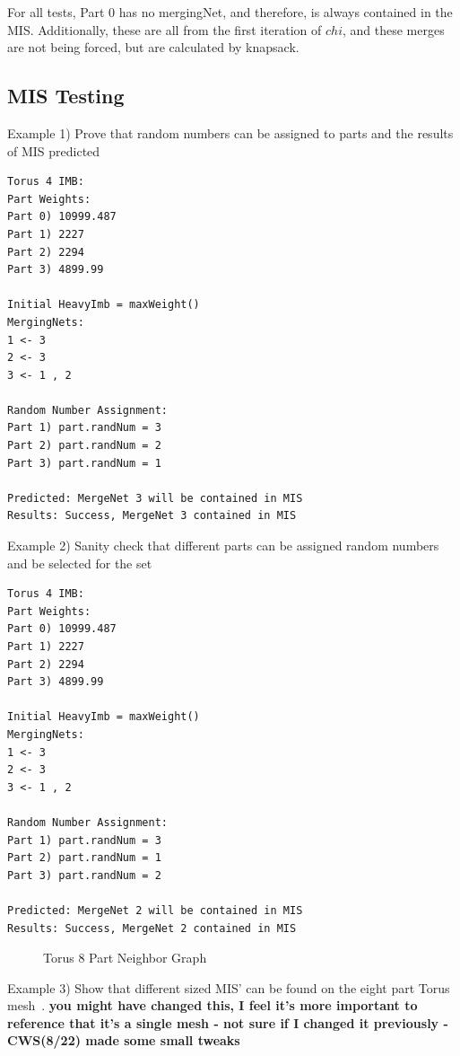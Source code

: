\documentclass[a4paper]{article}
\begin{document}
For all tests, Part 0 has no mergingNet, and therefore, is always contained in the MIS. Additionally, these are all from the first iteration of $chi$, and these merges are not being forced, but are calculated by knapsack.

\subsection{MIS Testing}

Example 1) Prove that random numbers can be assigned to parts and the results of MIS predicted

\begin{lstlisting}
Torus 4 IMB:
Part Weights:
Part 0) 10999.487
Part 1) 2227
Part 2) 2294
Part 3) 4899.99

Initial HeavyImb = maxWeight()
MergingNets:
1 <- 3
2 <- 3
3 <- 1 , 2

Random Number Assignment:
Part 1) part.randNum = 3
Part 2) part.randNum = 2
Part 3) part.randNum = 1

Predicted: MergeNet 3 will be contained in MIS
Results: Success, MergeNet 3 contained in MIS
\end{lstlisting}
Example 2) Sanity check that different parts can be assigned random numbers and be selected for the set
\begin{lstlisting}
Torus 4 IMB:
Part Weights:
Part 0) 10999.487
Part 1) 2227
Part 2) 2294
Part 3) 4899.99

Initial HeavyImb = maxWeight()
MergingNets:
1 <- 3
2 <- 3
3 <- 1 , 2

Random Number Assignment:
Part 1) part.randNum = 3
Part 2) part.randNum = 1
Part 3) part.randNum = 2

Predicted: MergeNet 2 will be contained in MIS
Results: Success, MergeNet 2 contained in MIS
\end{lstlisting}
\begin{figure}
\centering
\caption{Torus 8 Part Neighbor Graph ~\cite{meshes}}
\label{fig:torus8}
\end{figure}
Example 3) Show that different sized MIS' can be found on the eight part Torus mesh~\cite{meshes}. \textbf{you might have changed this, I feel it's more important to reference that it's a single mesh - not sure if I changed it previously - CWS(8/22) made some small tweaks}
\end{document}

